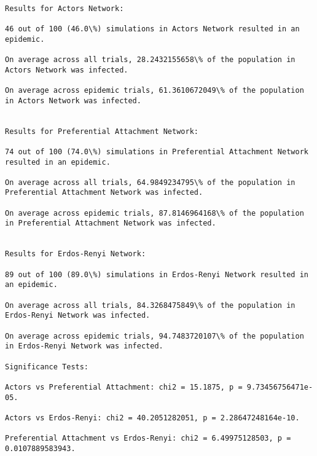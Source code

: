 \documentclass[11pt]{article}
\begin{document}
    \begin{Verbatim}[commandchars=\\\{\}]

Results for Actors Network:

46 out of 100 (46.0\%) simulations in Actors Network resulted in an epidemic.

On average across all trials, 28.2432155658\% of the population in Actors Network was infected.

On average across epidemic trials, 61.3610672049\% of the population in Actors Network was infected.


Results for Preferential Attachment Network:

74 out of 100 (74.0\%) simulations in Preferential Attachment Network resulted in an epidemic.

On average across all trials, 64.9849234795\% of the population in Preferential Attachment Network was infected.

On average across epidemic trials, 87.8146964168\% of the population in Preferential Attachment Network was infected.


Results for Erdos-Renyi Network:

89 out of 100 (89.0\%) simulations in Erdos-Renyi Network resulted in an epidemic.

On average across all trials, 84.3268475849\% of the population in Erdos-Renyi Network was infected.

On average across epidemic trials, 94.7483720107\% of the population in Erdos-Renyi Network was infected.

Significance Tests:

Actors vs Preferential Attachment: chi2 = 15.1875, p = 9.73456756471e-05.

Actors vs Erdos-Renyi: chi2 = 40.2051282051, p = 2.28647248164e-10.

Preferential Attachment vs Erdos-Renyi: chi2 = 6.49975128503, p = 0.0107889583943.


    \end{Verbatim}
\end{document}
